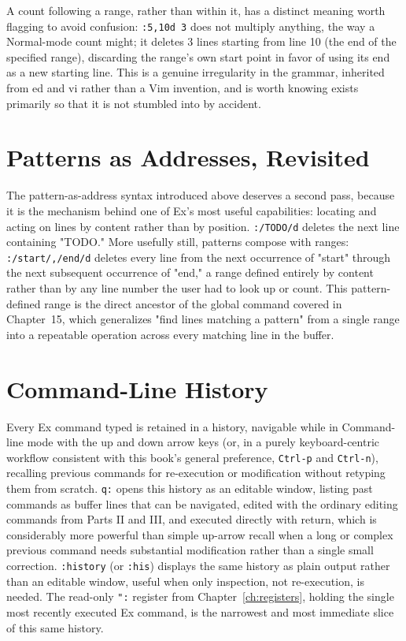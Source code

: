 A count following a range, rather than within it, has a distinct meaning worth flagging to avoid confusion: \texttt{:5,10d 3} does not multiply anything, the way a Normal-mode count might; it deletes 3 lines starting from line 10 (the end of the specified range), discarding the range's own start point in favor of using its end as a new starting line. This is a genuine irregularity in the grammar, inherited from ed and vi rather than a Vim invention, and is worth knowing exists primarily so that it is not stumbled into by accident.

\section{Patterns as Addresses, Revisited}

The pattern-as-address syntax introduced above deserves a second pass, because it is the mechanism behind one of Ex's most useful capabilities: locating and acting on lines by content rather than by position. \texttt{:/TODO/d} deletes the next line containing "TODO." More usefully still, patterns compose with ranges: \texttt{:/start/,/end/d} deletes every line from the next occurrence of "start" through the next subsequent occurrence of "end," a range defined entirely by content rather than by any line number the user had to look up or count. This pattern-defined range is the direct ancestor of the global command covered in Chapter~15, which generalizes "find lines matching a pattern" from a single range into a repeatable operation across every matching line in the buffer.

\section{Command-Line History}

Every Ex command typed is retained in a history, navigable while in Command-line mode with the up and down arrow keys (or, in a purely keyboard-centric workflow consistent with this book's general preference, \texttt{Ctrl-p} and \texttt{Ctrl-n}), recalling previous commands for re-execution or modification without retyping them from scratch. \texttt{q:} opens this history as an editable window, listing past commands as buffer lines that can be navigated, edited with the ordinary editing commands from Parts II and III, and executed directly with return, which is considerably more powerful than simple up-arrow recall when a long or complex previous command needs substantial modification rather than a single small correction. \texttt{:history} (or \texttt{:his}) displays the same history as plain output rather than an editable window, useful when only inspection, not re-execution, is needed. The read-only \texttt{":} register from Chapter~\ref{ch:registers}, holding the single most recently executed Ex command, is the narrowest and most immediate slice of this same history.

